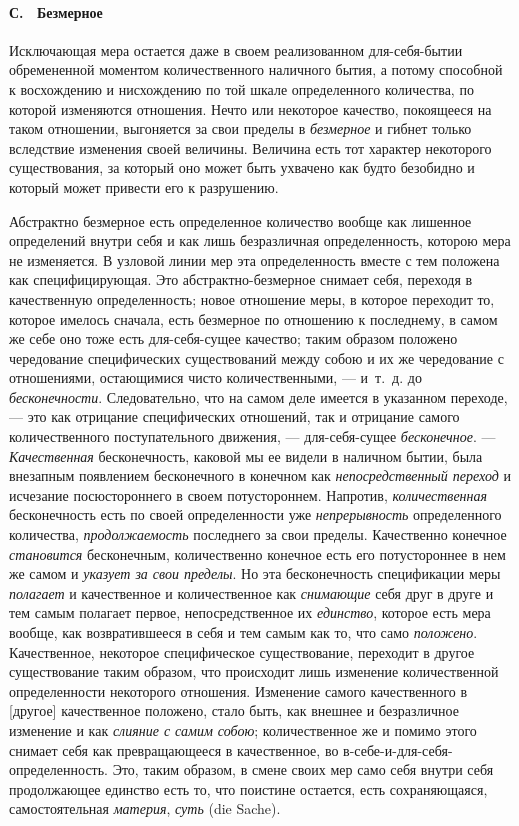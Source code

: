\paragraph[С. \ Безмерное]{С. \ Безмерное}
\hypertarget{Toc478978688}{}Исключающая мера остается даже в своем
реализованном для-себя-бытии обремененной моментом количественного
наличного бытия, а потому способной к восхождению и нисхождению по той
шкале определенного количества, по которой изменяются отношения. Нечто или
некоторое качество, покоящееся на таком отношении, выгоняется за свои
пределы в {\em безмерное} и гибнет только вследствие
изменения своей величины. Величина есть тот характер некоторого
существования, за который оно может быть ухвачено как будто безобидно и
который может привести его к разрушению.

Абстрактно безмерное есть определенное количество вообще как лишенное
определений внутри себя и как лишь безразличная определенность, которою
мера не изменяется. В узловой линии мер эта определенность вместе с тем
положена как специфицирующая. Это абстрактно-безмерное снимает себя,
переходя в качественную определенность; новое отношение меры, в которое
переходит то, которое имелось сначала, есть безмерное по отношению к
последнему, в самом же себе оно тоже есть для-себя-сущее качество; таким
образом положено чередование специфических существований между собою и их
же чередование с отношениями, остающимися чисто количественными, — и~т.~д.
до {\em бесконечности}. Следовательно, что на самом
деле имеется в указанном переходе, — это как отрицание специфических
отношений, так и отрицание самого количественного поступательного движения,
— для-себя-сущее {\em бесконечное}. —
{\em Качественная} бесконечность, каковой мы ее видели
в наличном бытии, была внезапным появлением бесконечного в конечном как
{\em непосредственный переход} и исчезание
посюстороннего в своем потустороннем. Напротив,
{\em количественная} бесконечность есть по своей
определенности уже {\em непрерывность} определенного
количества, {\em продолжаемость} последнего за свои
пределы. Качественно конечное {\em становится}
бесконечным, количественно конечное есть его потустороннее в нем же самом и
{\em указует за свои пределы}. Но эта бесконечность
спецификации меры {\em полагает} и качественное и
количественное как {\em снимающие} себя друг в друге и
тем самым полагает первое, непосредственное их
{\em единство}, которое есть мера вообще, как
возвратившееся в себя и тем самым как то, что само
{\em положено}. Качественное, некоторое специфическое
существование, переходит в другое существование таким образом, что
происходит лишь изменение количественной определенности некоторого
отношения. Изменение самого качественного в [другое] качественное положено,
стало быть, как внешнее и безразличное изменение и как
{\em слияние с самим собою}; количественное же и помимо
этого снимает себя как превращающееся в качественное, во
в-себе-и-для-себя-определенность. Это, таким образом, в смене своих мер
само себя внутри себя продолжающее единство есть то, что поистине остается,
есть сохраняющаяся, самостоятельная {\em материя},
{\em суть} (die Sache).

